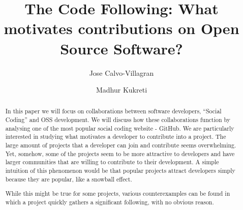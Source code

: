 \documentclass{acm_proc_article-sp}
\begin{document}
\title{The Code Following: What motivates contributions on Open Source Software?}
\author{
\alignauthor
Jose Calvo-Villagran
\and
\alignauthor
Madhur Kukreti
}

\maketitle

\begin{abstract}
In this paper we will focus on collaborations between software developers, ``Social Coding'' and OSS development. We will discuss how these collaborations function by analysing one of the most popular social coding website - GitHub. We are particularly interested in studying what motivates a developer to contribute into a project. The large amount of projects that a developer can join and contribute seems overwhelming. Yet, somehow, some of the projects seem to be more attractive to developers and have larger communities that are willing to  contribute to their development. A simple intuition of this phenomenon would be that popular projects attract developers simply because they are popular, like a snowball effect.

While this might be true for some projects, various counterexamples can be found in which a project quickly gathers a significant following, with no obvious reason.
\end{abstract}













\end{document}
